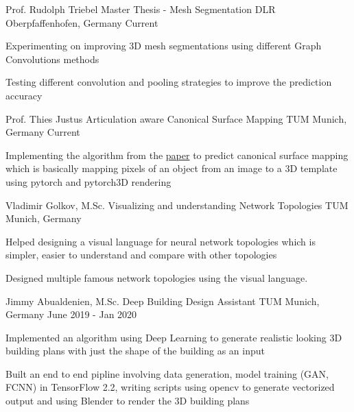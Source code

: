 
\begin{cventries}
	
	\cventry
	{Prof. Rudolph Triebel} %
	{Master Thesis - Mesh Segmentation} %
	{DLR Oberpfaffenhofen, Germany} %
	{Current} %
	{
		\begin{cvitems} %
			\item {Experimenting on improving 3D mesh segmentations using different Graph Convolutions methods}
			\item {Testing different convolution and pooling strategies to improve the prediction accuracy}
		\end{cvitems}
	}

	\cventry
	{Prof. Thies Justus} %
	{Articulation aware Canonical Surface Mapping} %
	{TUM Munich, Germany} %
	{Current} %
	{
		\begin{cvitems} %
			\item {Implementing the algorithm from the \href{https://arxiv.org/abs/2004.00614}{paper} to predict canonical surface mapping which is basically mapping pixels of an object from an image to a 3D template using pytorch and pytorch3D rendering}
		\end{cvitems}
	}
	
	\cventry
	{Vladimir Golkov, M.Sc.} %
	{Visualizing and understanding Network Topologies} %
	{TUM Munich, Germany} %
	{} %
	{
		\begin{cvitems} %
			\item {Helped designing a visual language for neural network topologies which is simpler, easier to understand and compare with other topologies}
			\item {Designed multiple famous network topologies using the visual language.}
		\end{cvitems}
	}
	
  \cventry
    {Jimmy Abualdenien, M.Sc.} %
    {Deep Building Design Assistant} %
    {TUM Munich, Germany} %
    {June 2019 - Jan 2020} %
    {
      \begin{cvitems} %
        \item {Implemented an algorithm using Deep Learning to generate realistic looking 3D building plans with just the shape of the building as an input}
		\item {Built an end to end pipline involving data generation, model training (GAN, FCNN) in TensorFlow 2.2, writing scripts using opencv to generate vectorized output and using Blender to render the 3D building plans}
      \end{cvitems}
    }


\end{cventries}
